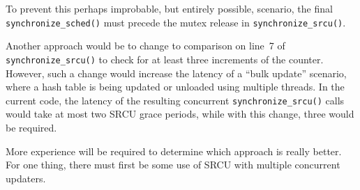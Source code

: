 	To prevent this perhaps improbable, but entirely possible,
	scenario, the final {\tt synchronize\_sched()} must precede
	the mutex release in {\tt synchronize\_srcu()}.

	Another approach would be to change to comparison on
	line~7 of {\tt synchronize\_srcu()} to check for at
	least three increments of the counter.
	However, such a change would increase the latency of a
	``bulk update'' scenario, where a hash table is being updated
	or unloaded using multiple threads.
	In the current code, the latency of the resulting concurrent
	{\tt synchronize\_srcu()} calls would take at most two SRCU
	grace periods, while with this change, three would be required.

	More experience will be required to determine which approach
	is really better.
	For one thing, there must first be some use of SRCU with
	multiple concurrent updaters.

